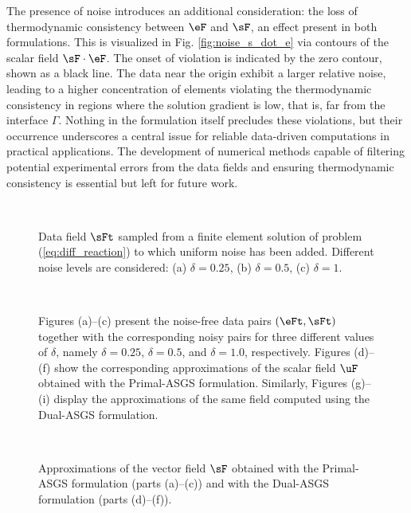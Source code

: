 The presence of noise introduces an additional consideration: the loss of thermodynamic consistency between $\eF$ and $\sF$, an effect present in both formulations. This is visualized 
in Fig. \ref{fig:noise_s_dot_e} via contours of the scalar field $\sF \cdot \eF$.
The onset of violation is indicated by the zero contour, shown as a black line.
The data near the origin exhibit a larger relative noise, leading to a higher concentration
of elements violating the thermodynamic consistency in regions where the solution gradient is 
low, that is, far from the interface $\Gamma$. Nothing in the formulation itself precludes 
these violations, but their occurrence underscores a central issue for reliable data-driven
computations in practical applications. The development of numerical methods capable of filtering potential experimental errors from the data fields and ensuring thermodynamic consistency is essential but left for future work.
\begin{figure}[ht!!]
	\centering
	\caption{Data field $\sFt$ sampled from a finite element solution of problem
		(\ref{eq:diff_reaction}) to which uniform noise has been added. Different noise levels are considered: (a) $\delta=0.25$, (b) $\delta=0.5$, (c) $\delta=1$.}
	~\\
	\fontsize{12pt}{10pt}\selectfont 
	\def\svgwidth{1.0\columnwidth}
	
	\label{fig:st_with_noise}
\end{figure}

\begin{figure}[h!]
	\centering
	\caption{Figures (a)--(c) present the noise-free data pairs $(\eFt,\sFt)$ together with the corresponding noisy pairs for three different values of $\delta$, namely $\delta = 0.25$, $\delta = 0.5$, and $\delta = 1.0$, respectively. Figures (d)--(f) show the corresponding approximations of the scalar field $\uF$ obtained with the Primal-ASGS formulation. Similarly, Figures (g)--(i) display the approximations of the same field computed using the Dual-ASGS formulation.}
	~\\
	\def\svgwidth{1.0\columnwidth}
	
	\label{fig:noise_graph_and_u}
\end{figure}

\begin{figure}[h!]
	\centering
	\caption{Approximations of the vector field $\sF$ obtained with the Primal-ASGS formulation (parts (a)--(c)) and with the Dual-ASGS formulation (parts (d)--(f)).}
	~\\
	\def\svgwidth{1.0\columnwidth}
	
	\label{fig:noise_s}
\end{figure}

